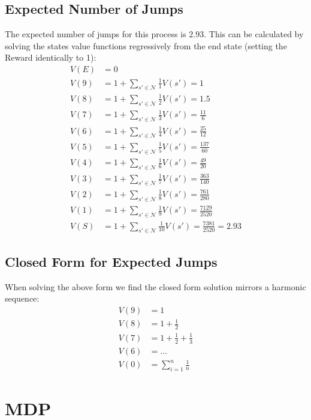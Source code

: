 \documentclass[11pt]{article}
\begin{document}
\subsection{Expected Number of Jumps}
The expected number of jumps for this process is $2.93$. This can be calculated by solving the states value functions regressively from the end state (setting the Reward identically to 1):
\begin{align}
    V(E) &= 0\\
    V(9) &= 1 + \sum_{s'\in\mathcal{N}} \frac{1}{1} V(s') = 1\\
    V(8) &= 1 + \sum_{s'\in\mathcal{N}} \frac{1}{2} V(s') = 1.5\\
    V(7) &= 1 + \sum_{s'\in\mathcal{N}} \frac{1}{3} V(s') = \frac{11}{6}\\
    V(6) &= 1 + \sum_{s'\in\mathcal{N}} \frac{1}{4} V(s') = \frac{25}{12}\\
    V(5) &= 1 + \sum_{s'\in\mathcal{N}} \frac{1}{5} V(s') = \frac{137}{60}\\
    V(4) &= 1 + \sum_{s'\in\mathcal{N}} \frac{1}{6} V(s') = \frac{49}{20}\\
    V(3) &= 1 + \sum_{s'\in\mathcal{N}} \frac{1}{7} V(s') = \frac{363}{140}\\
    V(2) &= 1 + \sum_{s'\in\mathcal{N}} \frac{1}{8} V(s') = \frac{761}{280}\\
    V(1) &= 1 + \sum_{s'\in\mathcal{N}} \frac{1}{9} V(s') = \frac{7129}{2520}\\
    V(S) &= 1 + \sum_{s'\in\mathcal{N}} \frac{1}{10} V(s') = \frac{7381}{2520} = 2.93
\end{align}

\subsection{Closed Form for Expected Jumps}
When solving the above form we find the closed form solution mirrors a harmonic sequence:
\begin{align}
    V(9) &= 1 \\
    V(8) &= 1 + \frac{1}{2} \\
    V(7) &= 1 + \frac{1}{2} + \frac{1}{3} \\
    V(6) &= ... \\
    V(0) &= \sum_{i=1}^n \frac{1}{n}
\end{align}

\newpage
\section{MDP}
\end{document}
